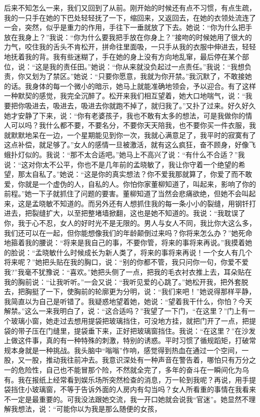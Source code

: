\documentclass[12pt,oneside]{book}
\begin{document}
后来不知怎么一来，我们又回到了从前。刚开始的时候还有点不习惯，有点生疏，我的一只手在她的下巴处轻轻抚了一下，缩回来，又返回去，在她的衣领处流连了一会，突然，似乎是重力的作用，手往下一垂就放了下去。她说：``你为什么把手放在我身上？''我说：``你为什么要我把手放在你身上？''接吻的时候她用了很大的力气，咬住我的舌头不肯松开，拼命往里面吸，一只手从我的衣服中伸进去，轻轻地抚着我的背。我有些迷糊了，手在她的身上没有方向地乱窜，最后停在某个部位，说：``这是我的责任田。''她说：``你从来就没负起过一点责任。''我说：``我想负责，你又划为了禁区。''她说：``只要你愿意，我就为你开禁。''我沉默了，不敢接她的话。我身体的每一个微小的暗示，她马上就能准确地领会，予以迎合。有了这样一种默契的感觉，我完全沉醉了。松开来我们相互望着，她大口地喘气，说：``我要把你吸进去，吸进去，吸进去你就跑不掉了，就归我了。''又扑了过来。好久好久她才安静了下来，说：``你有老婆孩子，我也不敢有太多的想法，可是我做你的情人可以吗？我什么都不要，不要名分，不要你天天陪我，也不要你买一件衣服，我就默默地呆在一边，一个星期能见到你一次，我就心满意足了，我平时的寂寞有了这点补偿，就足够了。''女人的感情一旦被激活，就有这么疯狂，奋不顾身，好像飞蛾扑灯似的。我说：``那不太合适吧。''她马上不高兴了说：``有什么不合适？''我说：``这对你太不公平，你也不是几年前的孟晓敏了，我让你守着一个绝望的希望，那太自私了。''她说：``这是你的真实想法？你不爱我那就算了，你爱了而不敢爱，你就是一个虚伪的人，自私的人。你怕你家董柳知道了，叫起来，影响了你的前程。''她一下子就抓住了问题的要害。董柳知道了当然会悲痛欲绝，但她不会叫起来，这是孟晓敏不知道的。而另外还有人想抓住我的每一条小小的裂缝，用钢钎打进去，把裂缝扩大，以至把整堵墙掀翻，这也是她不知道的。我说：``我耽误了你，我于心不忍，女人的好时光不是无限的。男人与女人不同，我比你大这么多，我们还可以在一起，但你能想像我们的年龄颠倒过来吗？你将来怎么办？''她死命地箍着我的腰说：``将来是我自己的事，不要你管，将来的事将来再说。''我摸着她的脸说：``孟晓敏什么时候成长为新人类了，将来的事将来再说！一个女人有几个将来呢？''她把头贴在我的胸口，说：``别的你都不管，我只问你一句，你爱不爱我?''我毫不犹豫说：``喜欢。''她把头侧了一点，把我的毛衣衬衣推上去，耳朵贴在我的胸前说：``让我听听。''一会又说：``我听见爱的心跳了。''她松开我，把外套脱去，把胸挺了一下，使胸前的轮廓更为分明，说：``我们来吧！''她说得那样平静，我简直以为自己是听错了。我疑惑地望着她，她说：``望着我干什么，你怕？今天解禁。''这么一来我明白了，说：``这合适吗？''我望了一下门，``在这里？''门上有一个玻璃小窗，她走过去想用提袋把玻璃挡住，可没地方挂，就把门开了一点，把提袋的带子压在门缝里，提袋垂下来，正好把玻璃窗挡住。我说：``在这里？''在沙发上做这件事，真的有一种特殊的刺激，特别的诱惑。平时习惯了循规蹈矩，打破常规本身就是一种挑战。我头脑中``嗡嗡''作响，感觉得到热血在通过一个空间，一股，又一股，推动我往前冲去。我意识深处有一种声音在警告着，哪怕只有万分之一的危险性，自己也不能冒那个险，不然就全完了，多年的奋斗在一瞬间化为乌有。我在报纸上经常看到娱乐场所突然检查的消息，万一轮到我呢？再说，用手提袋挡住小玻璃窗，不等于告诉外面的人房内有勾当吗？女人所看重的事情在我看来不一定是最重要的。可我没法跟她交流，我一开口她就会说我``官迷''。她显然不理解我想法，说：``可能你以为我是那么随便的女孩，
\end{document}
